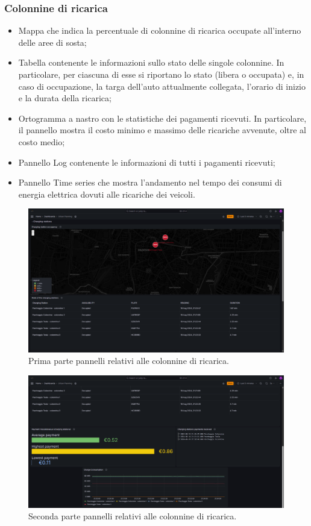 \documentclass[8pt]{article}
\begin{document}
\subsubsection{Colonnine di ricarica}
\begin{itemize}
\setlength\itemsep{0em}
    \item Mappa che indica la percentuale di colonnine di ricarica occupate all'interno delle aree di sosta;
    \item Tabella contenente le informazioni sullo stato delle singole colonnine. In particolare, per ciascuna di esse si riportano lo stato (libera o occupata) e, in caso di occupazione, la targa dell'auto attualmente collegata, l'orario di inizio e la durata della ricarica;
    \item Ortogramma a nastro con le statistiche dei pagamenti ricevuti. In particolare, il pannello mostra il costo minimo e massimo delle ricariche avvenute, oltre al costo medio;
    \item Pannello Log contenente le informazioni di tutti i pagamenti ricevuti;
    \item Pannello Time series che mostra l'andamento nel tempo dei consumi di energia elettrica dovuti alle ricariche dei veicoli.
\end{itemize}
\begin{figure}[H]
    \centering
    \includegraphics[width=15cm]{images_mu/charging_station1.png}
    \caption{Prima parte pannelli relativi alle colonnine di ricarica.}
    \label{fig:Prima parte pannelli relativi alle colonnine di ricarica.}
\end{figure}
\begin{figure}[H]
    \centering
    \includegraphics[width=15cm]{images_mu/charging_station2.png}
    \caption{Seconda parte pannelli relativi alle colonnine di ricarica.}
    \label{fig:Seconda parte pannelli relativi alle colonnine di ricarica.}
\end{figure}
\end{document}
